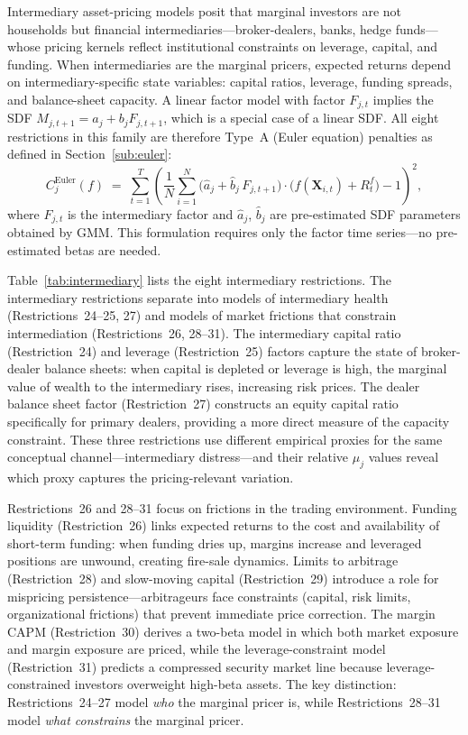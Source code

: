 Intermediary asset-pricing models posit that marginal investors are not households but financial intermediaries---broker-dealers, banks, hedge funds---whose pricing kernels reflect institutional constraints on leverage, capital, and funding.
When intermediaries are the marginal pricers, expected returns depend on intermediary-specific state variables: capital ratios, leverage, funding spreads, and balance-sheet capacity.
A linear factor model with factor $F_{j,t}$ implies the SDF $M_{j,t+1} = a_j + b_j F_{j,t+1}$, which is a special case of a linear SDF.
All eight restrictions in this family are therefore Type~A (Euler equation) penalties as defined in Section~\ref{sub:euler}:
\begin{equation}\label{eq:intermediary_family}
C_j^{\mathrm{Euler}}(f) \;=\;
\sum_{t=1}^{T}
\left(
\frac{1}{N}\sum_{i=1}^{N}
\bigl(\hat{a}_j + \hat{b}_j\, F_{j,t+1}\bigr)
\cdot
\bigl(f(\mathbf{X}_{i,t}) + R_t^f\bigr) - 1
\right)^2,
\end{equation}
where $F_{j,t}$ is the intermediary factor and $\hat{a}_j$, $\hat{b}_j$ are pre-estimated SDF parameters obtained by GMM.
This formulation requires only the factor time series---no pre-estimated betas are needed.

Table~\ref{tab:intermediary} lists the eight intermediary restrictions. The intermediary restrictions separate into models of intermediary health (Restrictions~24--25, 27) and models of market frictions that constrain intermediation (Restrictions~26, 28--31).
The intermediary capital ratio (Restriction~24) and leverage (Restriction~25) factors capture the state of broker-dealer balance sheets: when capital is depleted or leverage is high, the marginal value of wealth to the intermediary rises, increasing risk prices.
The dealer balance sheet factor (Restriction~27) constructs an equity capital ratio specifically for primary dealers, providing a more direct measure of the capacity constraint.
These three restrictions use different empirical proxies for the same conceptual channel---intermediary distress---and their relative $\mu_j$ values reveal which proxy captures the pricing-relevant variation.

Restrictions~26 and 28--31 focus on frictions in the trading environment.
Funding liquidity (Restriction~26) links expected returns to the cost and availability of short-term funding: when funding dries up, margins increase and leveraged positions are unwound, creating fire-sale dynamics.
Limits to arbitrage (Restriction~28) and slow-moving capital (Restriction~29) introduce a role for mispricing persistence---arbitrageurs face constraints (capital, risk limits, organizational frictions) that prevent immediate price correction.
The margin CAPM (Restriction~30) derives a two-beta model in which both market exposure and margin exposure are priced, while the leverage-constraint model (Restriction~31) predicts a compressed security market line because leverage-constrained investors overweight high-beta assets.
The key distinction: Restrictions~24--27 model \emph{who} the marginal pricer is, while Restrictions~28--31 model \emph{what constrains} the marginal pricer.


